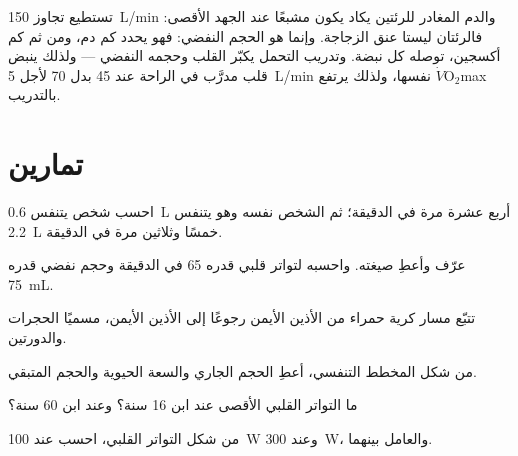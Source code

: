 \begin{remark}\label{rem:g10:heart-lungs-effort:limit}
 تستطيع تجاوز \qty{150}{L/min} والدم المغادر للرئتين يكاد يكون
مشبعًا عند الجهد الأقصى: فالرئتان ليستا عنق الزجاجة. وإنما هو الحجم
النفضي: فهو يحدد كم دم، ومن ثم كم أكسجين، توصله كل نبضة. وتدريب التحمل
يكبّر القلب وحجمه النفضي --- ولذلك ينبض قلب مدرَّب في الراحة عند 45
بدل 70 لأجل \qty{5}{L/min} نفسها، ولذلك يرتفع
$\dot V\!\mathrm{O_2}$max بالتدريب.
\end{remark}

\section{تمارين}

\begin{exercise}[$\star$]\label{exo:g10:heart-lungs-effort:1}
احسب  شخص يتنفس \qty{0.6}{L} أربع عشرة مرة في الدقيقة؛ ثم 
الشخص نفسه وهو يتنفس \qty{2.2}{L} خمسًا وثلاثين مرة في الدقيقة.
\end{exercise}

\begin{exercise}[$\star$]\label{exo:g10:heart-lungs-effort:2}
عرّف  وأعطِ صيغته. واحسبه لتواتر قلبي قدره 65 في الدقيقة
وحجم نفضي قدره \qty{75}{mL}.
\end{exercise}

\begin{exercise}[$\star$]\label{exo:g10:heart-lungs-effort:3}
تتبّع مسار كرية حمراء من الأذين الأيمن رجوعًا إلى الأذين الأيمن، مسميًا
الحجرات والدورتين.
\end{exercise}

\begin{exercise}[$\star$]\label{exo:g10:heart-lungs-effort:4}
من شكل المخطط التنفسي، أعطِ الحجم الجاري والسعة الحيوية والحجم
المتبقي.
\end{exercise}

\begin{exercise}[$\star$]\label{exo:g10:heart-lungs-effort:5}
ما التواتر القلبي الأقصى عند ابن 16 سنة؟ وعند ابن 60 سنة؟
\end{exercise}

\begin{exercise}[$\star\star$]\label{exo:g10:heart-lungs-effort:6}
من شكل التواتر القلبي، احسب  عند \qty{100}{W} وعند
\qty{300}{W}، والعامل بينهما.
\end{exercise}

